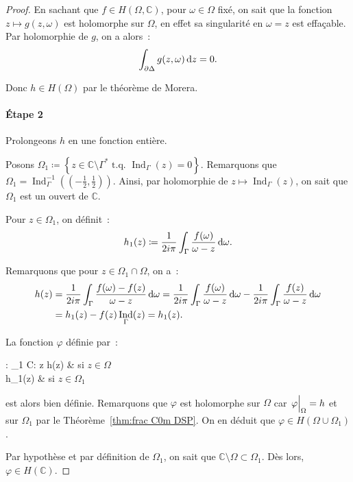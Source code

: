 \documentclass{report}
\theoremstyle{definition}
\theoremstyle{remark}
\numberwithin{equation}{section}
\newcommand{\C}{\mathbb C}
\newcommand{\tq}{\text{ t.q. }}
\DeclareMathOperator{\Ind}{Ind}
\newcommand{\restr}[2]{\left.#1\vphantom{\big|}\right|_{#2}}
\begin{document}
\begin{proof}
			En sachant que $f \in H(\Omega, \C)$, pour $\omega \in \Omega$ fixé, on sait que la fonction $z \mapsto g(z, \omega)$ est holomorphe sur $\Omega$,
			en effet sa singularité en $\omega=z$ est effaçable. Par holomorphie de $g$, on a alors~:
			\begin{equation}
				\int_{\partial \Delta}g(z, \omega)\dif z = 0.
			\end{equation}

			Donc $h \in H(\Omega)$ par le théorème de Morera.

			\paragraph*{Étape 2} Prolongeons $h$ en une fonction entière.

			Posons $\Omega_1 \coloneqq \left\{z \in \C \setminus \Gamma^* \tq \Ind_\Gamma(z) = 0\right\}$.
			Remarquons que $\Omega_1 = \Ind_\Gamma^{-1}\left(\left(-\frac 12, \frac 12\right)\right)$. Ainsi, par holomorphie de $z \mapsto \Ind_\Gamma(z)$,
			on sait que $\Omega_1$ est un ouvert de $\C$.

			Pour $z \in \Omega_1$, on définit~:
			\begin{equation}
				h_1(z) \coloneqq \frac 1{2i\pi}\int_\Gamma\frac {f(\omega)}{\omega-z}\dif \omega.
			\end{equation}

			Remarquons que pour $z \in \Omega_1 \cap \Omega$, on a~:
			\begin{align}
				h(z) &= \frac 1{2i\pi}\int_\Gamma \frac {f(\omega)-f(z)}{\omega-z}\dif \omega
					= \frac 1{2i\pi}\int_\Gamma \frac {f(\omega)}{\omega-z}\dif \omega - \frac 1{2i\pi}\int_\Gamma\frac {f(z)}{\omega-z}\dif \omega \\
					&= h_1(z) - f(z)\Ind_\Gamma(z) = h_1(z).
			\end{align}

			La fonction $\varphi$ définie par~:
			\begin{subnumcases}
				{\varphi : \Omega \cup \Omega_1 \to \C : z \mapsto}
					h(z) & si $z \in \Omega$ \\
					h_1(z) & si $z \in \Omega_1$
			\end{subnumcases}
			est alors bien définie. Remarquons que $\varphi$ est holomorphe sur $\Omega$ car $\restr \varphi\Omega = h$ et sur $\Omega_1$ par le
			Théorème~\ref{thm:frac C0m DSP}. On en déduit que $\varphi \in H(\Omega \cup \Omega_1)$.

			Par hypothèse et par définition de $\Omega_1$, on sait que $\C \setminus \Omega \subset \Omega_1$. Dès lors, $\varphi \in H(\C)$.


\end{proof}
\end{document}
